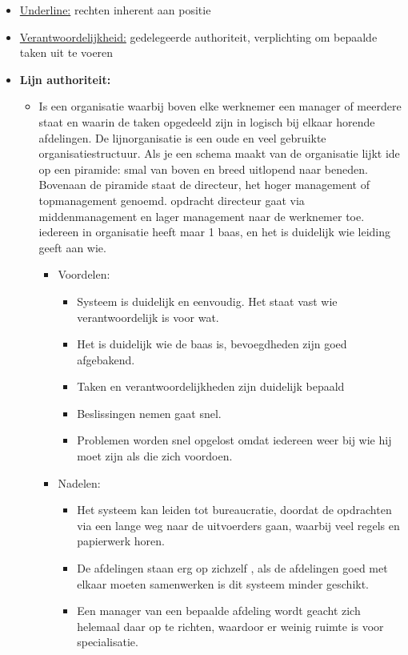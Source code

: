 \documentclass[12pt]{article}
\begin{document}
\begin{enumerate}
\begin{itemize}
        \item \underline{Underline:} rechten inherent aan positie
        \item \underline{Verantwoordelijkheid:} gedelegeerde authoriteit, verplichting om bepaalde taken uit te voeren
        \item[]\textbf{Lijn authoriteit:}\begin{itemize}
            \item Is een organisatie waarbij boven elke werknemer een manager of meerdere staat en waarin de taken opgedeeld zijn in logisch bij elkaar horende afdelingen. De lijnorganisatie is een oude en veel gebruikte organisatiestructuur. Als je een schema maakt van de organisatie lijkt ide op een piramide: smal van boven en breed uitlopend naar beneden. Bovenaan de piramide staat de directeur, het hoger management of topmanagement genoemd. opdracht directeur gaat via middenmanagement en lager management naar de werknemer toe. iedereen in organisatie heeft maar 1 baas, en het is duidelijk wie leiding geeft aan wie.\begin{itemize}
                \item Voordelen:\begin{itemize}
                    \item Systeem is duidelijk en eenvoudig. Het staat vast wie verantwoordelijk is voor wat.
                    \item Het is duidelijk wie de baas is, bevoegdheden zijn goed afgebakend.
                    \item Taken en verantwoordelijkheden zijn duidelijk bepaald
                    \item Beslissingen nemen gaat snel.
                    \item Problemen worden snel opgelost omdat iedereen weer bij wie hij moet zijn als die zich voordoen.
                \end{itemize}
                \item Nadelen:\begin{itemize}
                    \item Het systeem kan leiden tot bureaucratie, doordat de opdrachten via een lange weg naar de uitvoerders gaan, waarbij veel regels en papierwerk horen.
                    \item De afdelingen staan erg op zichzelf , als de afdelingen goed met elkaar moeten samenwerken is dit systeem minder geschikt.
                    \item Een manager van een bepaalde afdeling wordt geacht zich helemaal daar op te richten, waardoor er weinig ruimte is voor specialisatie.

\end{itemize}
\end{itemize}
\end{itemize}
\end{itemize}
\end{enumerate}
\end{document}
